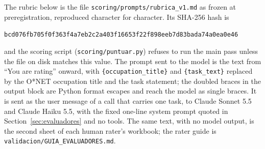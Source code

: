 \documentclass[preprint,12pt,authoryear]{elsarticle}
\begin{document}
The rubric below is the file \texttt{scoring/prompts/rubrica\_v1.md} as frozen at preregistration, reproduced character for character.
Its SHA-256 hash is
\begin{center}\small\texttt{bcd076fb705f0f363f4a7eb2c2a403f16653f22f898eeb7d83bada74a0ea0e46}\end{center}
and the scoring script (\texttt{scoring/puntuar.py}) refuses to run the main pass unless the file on disk matches this value.
The prompt sent to the model is the text from ``You are rating'' onward, with \texttt{\{occupation\_title\}} and \texttt{\{task\_text\}} replaced by the O*NET occupation title and the task statement; the doubled braces in the output block are Python format escapes and reach the model as single braces.
It is sent as the user message of a call that carries one task, to Claude Sonnet 5.5 and Claude Haiku 5.5, with the fixed one-line system prompt quoted in Section~\ref{sec:evaluadores} and no tools.
The same text, with no model output, is the second sheet of each human rater's workbook; the rater guide is \texttt{validacion/GUIA\_EVALUADORES.md}.
\end{document}
